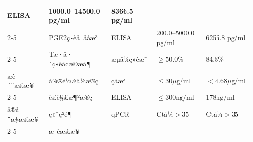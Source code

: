 \documentclass[UTF8,10pt,a4paper,fontset=fandol]{ctexart}
\newcommand{\fieldvalue}[1]{#1}
\begin{document}
\begin{tabularx}{\textwidth}{|p{2.2cm}|p{3.0cm}|p{2.7cm}|X|X|}
\fieldvalue{ELISA}
&
\fieldvalue{1000.0--14500.0 pg/ml}
&
\fieldvalue{8366.5 pg/ml}
\\ \cline{2-5}
&
\fieldvalue{PGE2ç»èå å­åæ³}
&
\fieldvalue{ELISA}
&
\fieldvalue{200.0--5000.0 pg/ml}
&
\fieldvalue{6255.8 pg/ml}
\\ \cline{2-5}
&
\fieldvalue{Tæ·å·´ç»èå¢æ®æå¶}
&
\fieldvalue{æµå¼ç»èæ¯}
&
\fieldvalue{$\geq 50.0\%$}
&
\fieldvalue{84.8\%}
\\ \hline
\fieldvalue{æè´¨æ£æ¥}
&
\fieldvalue{å¾®è½½ä½æ®ç}
&
\fieldvalue{çåæ³}
&
\fieldvalue{$\leq 30\mu\mathrm{g}/\mathrm{ml}$}
&
\fieldvalue{$<4.68\mu\mathrm{g}/\mathrm{ml}$}
\\ \cline{2-5}
&
\fieldvalue{è£è§£æ¶²æ®ç}
&
\fieldvalue{ELISA}
&
\fieldvalue{$\leq 300\mathrm{ng}/\mathrm{ml}$}
&
\fieldvalue{178$\mathrm{ng}/\mathrm{ml}$}
\\ \hline
\fieldvalue{å®å¨æ§æ£æ¥}
&
\fieldvalue{ç«¯ç²é¶}
&
\fieldvalue{qPCR}
&
\fieldvalue{Ctå¼$>35$}
&
\fieldvalue{Ctå¼$>35$}
\\ \cline{2-5}
&
\fieldvalue{æ èæ£æ¥}

\end{tabularx}
\end{document}

